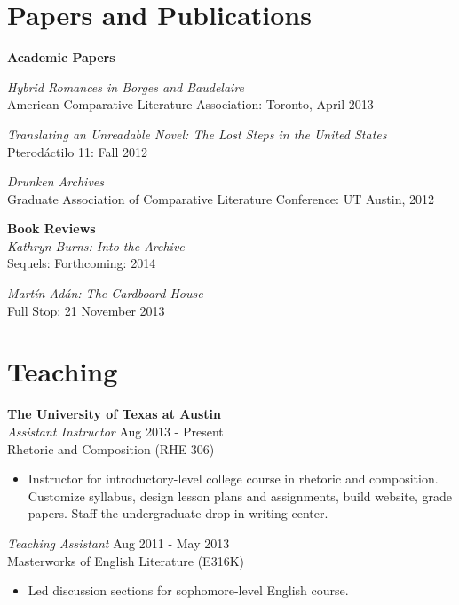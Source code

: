 \documentclass[margin,centered]{resume}
\newcommand{\employerName}[1]{\textbf{#1}}
\newcommand{\jobPosition}[1]{\textit{#1}}
\newcommand{\subtitle}[1]{\textbf{#1}}
\begin{document}
\begin{resume}
    \section{\mysidestyle Papers and Publications}
	
	{\subtitle{Academic Papers}}
	
    \textsl{Hybrid Romances in Borges and Baudelaire} \\
    American Comparative Literature Association: Toronto, April 2013 

    \textsl{Translating an Unreadable Novel: The Lost Steps in the United States} \\
    Pterod\'{a}ctilo 11: Fall 2012 

    \textsl{Drunken Archives} \\
    Graduate Association of Comparative Literature Conference: UT Austin, 2012
	
	{\subtitle{Book Reviews}}\\
	\textsl{Kathryn Burns: Into the Archive}\\ 
    Sequels: Forthcoming: 2014 \\
    \vspace{2mm}

    \textsl{Mart\'{i}n Ad\'{a}n: The Cardboard House}\\ 
    Full Stop: 21 November 2013 \\
    \vspace{-2mm}

    \section{\mysidestyle Teaching}

    \employerName{The University of Texas at Austin}\\
    \jobPosition{Assistant Instructor} \hfill Aug 2013 - Present \\
    Rhetoric and Composition (RHE 306)
    \begin{itemize}  \itemsep -2pt
        \item Instructor for introductory-level college course in rhetoric and composition. Customize syllabus, design lesson plans and assignments, build website, grade papers. Staff the undergraduate drop-in writing center.
    \end{itemize}
	\vspace{1mm}
	
    \jobPosition{Teaching Assistant} \hfill Aug 2011 - May 2013 \\
    Masterworks of English Literature (E316K)
    \begin{itemize}  \itemsep -2pt
        \item Led discussion sections for sophomore-level English course. %
    \end{itemize}
    \vspace{1mm}
	

\end{resume}
\end{document}
